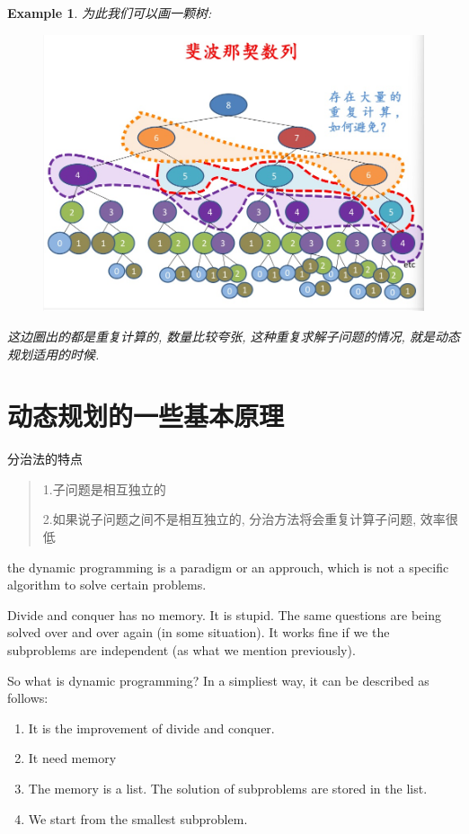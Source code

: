\documentclass[a4paper, 10pt]{ctexart} %
\newtheorem{example}{Example}
\begin{document}
\begin{example}
    为此我们可以画一颗树:
    \begin{figure}[H]
        \centering
        \includegraphics[scale = 0.3]{2.jpg}
    \end{figure}

    这边圈出的都是重复计算的, 数量比较夸张, 这种重复求解子问题的情况,
    就是动态规划适用的时候.
\end{example}

\section{动态规划的一些基本原理}

分治法的特点
\begin{quotation}
    1.子问题是相互独立的

    2.如果说子问题之间不是相互独立的, 分治方法将会重复计算子问题, 效率很低
\end{quotation}

the dynamic programming is a paradigm or an approuch, which is not a 
specific algorithm to solve certain problems.

Divide and conquer has no memory. It is stupid. The same questions are 
being solved over and over again (in some situation). It works fine if we 
the subproblems are independent (as what we mention previously).

So what is dynamic programming? In a simpliest way, it can be described as follows:
\begin{enumerate}
    \item It is the improvement of divide and conquer.
    \item It need memory
    \item The memory is a list. The solution of subproblems are stored in the 
    list.
    \item We start from the smallest subproblem.
\end{enumerate}
\end{document}
